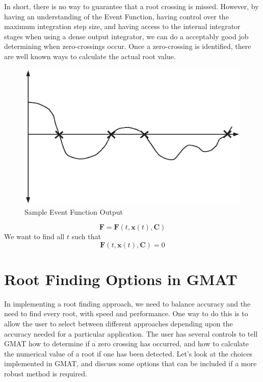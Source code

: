 In short, there is no way to guarantee that a root crossing is
missed.  However, by having an understanding of the Event Function,
having control over the maximum integration step size, and having
access to the internal integrator stages when using a dense output
integrator, we can do a acceptably good job determining when
zero-crossings occur.  Once a zero-crossing is identified, there are
well known ways to calculate the actual root value.




\begin{figure}[htb]
    \centering
        \includegraphics[scale=1.0]{Images/EventsFunction.eps}
    \caption{ Sample Event Function Output }
    \label{fig:SampleEventFunction}
\end{figure}

\begin{equation}
    \mathbf{F} = \mathbf{F} (t, \mathbf{x}(t),\mathbf{C}   )
\end{equation}
%
We want to find all $t$ such that
%
\begin{equation}
    \mathbf{F} (t, \mathbf{x}(t),\mathbf{C}   ) = 0
\end{equation}


\section{Root Finding Options in GMAT}

In implementing a root finding approach, we need to balance accuracy
and the need to find every root, with speed and performance.  One
way to do this is to allow the user to select between different
approaches depending upon the accuracy needed for a particular
application.   The user has several controls to tell GMAT how to
determine if a zero crossing has occurred, and how to calculate the
numerical value of a root if one has been detected. Let's look at
the choices implemented in GMAT, and discuss some options that can
be included if a more robust method is required.

